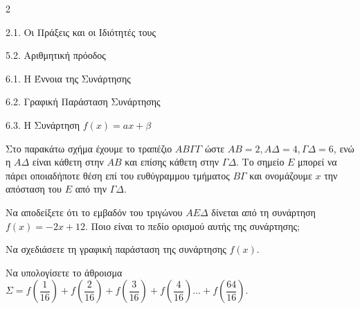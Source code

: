 \begin{ylh}{2}
    \item 2.1. Οι Πράξεις και οι Ιδιότητές τους
    \item 5.2. Αριθμητική πρόοδος
    \item 6.1. Η Έννοια της Συνάρτησης
    \item 6.2. Γραφική Παράσταση Συνάρτησης
    \item 6.3. Η Συνάρτηση $f(x)=ax+\beta$
\end{ylh}

Στο παρακάτω σχήμα έχουμε το τραπέζιο $AB\varGamma\varGamma$ ώστε $AB=2, A\varDelta=4, \varGamma\varDelta=6$, ενώ η $A\varDelta$ είναι κάθετη στην $AB$ και επίσης κάθετη στην $\varGamma\varDelta$. Το σημείο $E$ μπορεί να πάρει οποιαδήποτε θέση επί του ευθύγραμμου τμήματος $B\varGamma$ και ονομάζουμε $x$ την απόσταση του $E$ από την $\varGamma\varDelta$.
\begin{center}
\end{center}
\begin{alist}
\item Να αποδείξετε ότι το εμβαδόν του τριγώνου $AE\varDelta$ δίνεται από τη συνάρτηση
$f(x) = - 2x + 12$. Ποιο είναι το πεδίο ορισμού αυτής της συνάρτησης;

\item Να σχεδιάσετε τη γραφική παράσταση της συνάρτησης $f(x).$

\item Να υπολογίσετε το άθροισμα $\Sigma = f\left( \dfrac{1}{16} \right) + f\left( \dfrac{2}{16} \right) + f\left( \dfrac{3}{16} \right) + f\left( \dfrac{4}{16} \right)\ldots + f\left(\dfrac{64}{16}\right).$
\end{alist}


